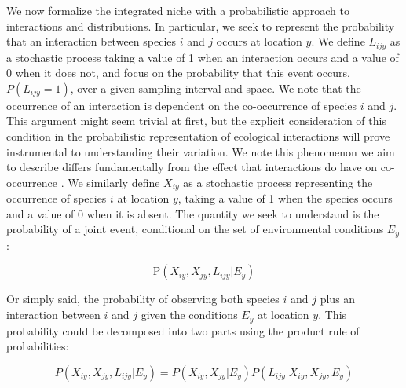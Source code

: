 \documentclass[12pt]{article}
\begin{document}
We now formalize the integrated niche with a probabilistic approach to
interactions and distributions. In particular, we seek to represent the
probability that an interaction between species $i$ and $j$ occurs at location
$y$. We define $L_{ijy}$ as a stochastic process taking a value of 1 when an
interaction occurs and a value of 0 when it does not, and focus on the
probability that this event occurs, $P(L_{ijy} = 1)$, over a given sampling
interval and space. We note that the occurrence of an interaction is dependent
on the co-occurrence of species $i$ and $j$. This argument might seem trivial
at first, but the explicit consideration of this condition in the
probabilistic representation of ecological interactions will prove
instrumental to understanding their variation. We note this phenomenon we aim
to describe differs fundamentally from the effect that interactions do have on
co-occurrence \citep{Cazelles2016}. We similarly define $X_{iy}$ as a
stochastic process representing the occurrence of species $i$ at location
$y$, taking a value of 1 when the species occurs and a value of 0 when it is
absent. The quantity we seek to understand is the probability of a joint
event, conditional on the set of environmental conditions $E_y$:

\begin{equation}
	\text{P}(X_{iy},X_{jy},L_{ijy}\lvert E_y)
\end{equation}

Or simply said, the probability of observing both species $i$ and $j$ plus an
interaction between $i$ and $j$ given the conditions $E_y$ at location $y$.
This probability could be decomposed into two parts using the product rule of
probabilities:

\begin{equation}
	P(X_{iy},X_{jy},L_{ijy}\lvert E_y)=P(X_{iy},X_{jy}\lvert E_y)P(L_{ijy}\lvert X_{iy},X_{jy},E_y)
\end{equation}
\end{document}
